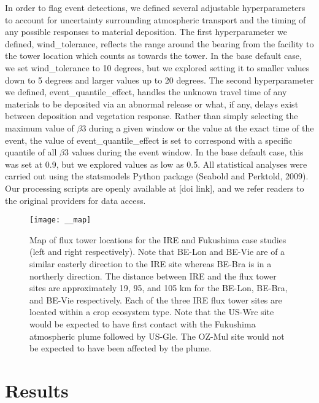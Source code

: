 \documentclass{article}
\begin{document}
In order to flag event detections, we defined several adjustable hyperparameters to account for uncertainty surrounding atmospheric transport and the timing of any possible responses to material deposition. The first hyperparameter we defined, wind\_tolerance, reflects the range around the bearing from the facility to the tower location which counts as towards the tower. In the base default case, we set wind\_tolerance to 10 degrees, but we explored setting it to smaller values down to 5 degrees and larger values up to 20 degrees. The second hyperparameter we defined, event\_quantile\_effect, handles the unknown travel time of any materials to be deposited via an abnormal release or what, if any, delays exist between deposition and vegetation response. Rather than simply selecting the maximum value of $\beta$3 during a given window or the value at the exact time of the event, the value of event\_quantile\_effect is set to correspond with a specific quantile of all $\beta$3 values during the event window. In the base default case, this was set at 0.9, but we explored values as low as 0.5. All statistical analyses were carried out using the statsmodels Python package (Seabold and Perktold, 2009). Our processing scripts are openly available at [doi link], and we refer readers to the original providers for data access.

\begin{figure}
	\centering
	\texttt{[image: \_\_map]}
	\caption{Map of flux tower locations for the IRE and Fukushima case studies (left and right respectively). Note that BE-Lon and BE-Vie are of a similar easterly direction to the IRE site whereas BE-Bra is in a northerly direction. The distance between IRE and the flux tower sites are approximately 19, 95, and 105 km for the BE-Lon, BE-Bra, and BE-Vie respectively. Each of the three IRE flux tower sites are located within a crop ecosystem type. Note that the US-Wrc site would be expected to have first contact with the Fukushima atmospheric plume followed by US-Gle. The OZ-Mul site would not be expected to have been affected by the plume.}
	\label{fig:study_site}
\end{figure}

\section{Results}
\end{document}
